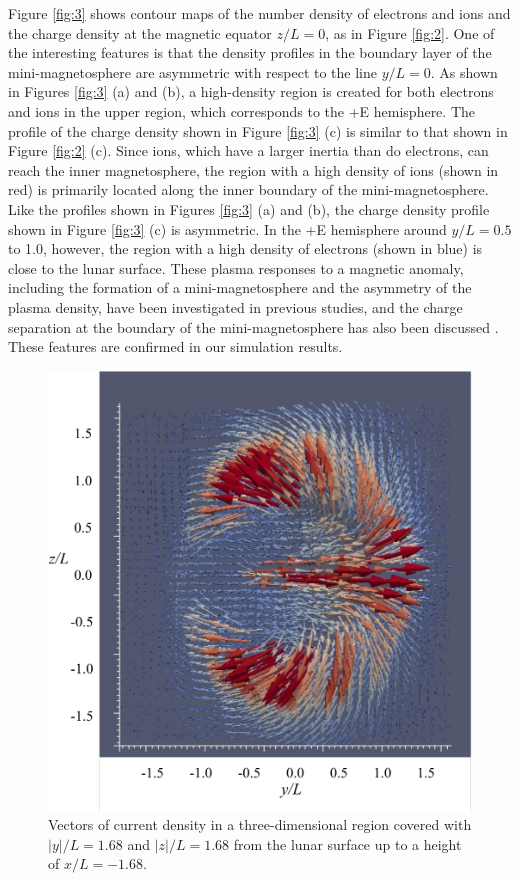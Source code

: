 \documentclass[draft,jgrga]{agutex2015}
\begin{document}
\begin{article}
Figure \ref{fig:3} shows contour maps of the number density of 
electrons and ions and the charge density 
at the magnetic equator $z/L=0$, as in 
Figure \ref{fig:2}. 
One of the interesting features is that the density profiles 
in the boundary layer of the mini-magnetosphere
are asymmetric with respect to the line $y/L =0$.
As shown in Figures \ref{fig:3} (a) and (b), a high-density region is created 
for both electrons and ions in the upper region,
which corresponds to the +E hemisphere. 
The profile of the charge density shown in Figure \ref{fig:3} (c) is 
similar to that shown in Figure \ref{fig:2} (c). 
Since ions, which have a larger inertia than do electrons, can reach the inner magnetosphere, the region with a 
high density of ions (shown in red) is primarily located
along the inner boundary of the mini-magnetosphere. 
Like the profiles shown in Figures \ref{fig:3} (a) and (b), 
the charge density profile shown in Figure \ref{fig:3} (c) is asymmetric. 
In the +E hemisphere around $y/L = 0.5$ to 1.0, however, the region with a
high density of electrons (shown in blue) is close to the lunar surface. 
These plasma responses to a magnetic anomaly, 
including the formation of a mini-magnetosphere and 
the asymmetry of the plasma density, have been investigated 
in previous studies, and the charge separation at the boundary of the mini-magnetosphere has also been discussed
 \citep[e.g.,][]{Harnett2002,Kallio2012,Poppe2012a,Deca2014,Deca2015}.
These features are confirmed in our simulation results.


\begin{figure}[h]
\centering
\noindent\includegraphics[width=12cm]{./figures/Fig_4_bb-crop.pdf}
\caption{
Vectors of current density in a three-dimensional region 
covered with $|y|/L=1.68$ and $|z|/L=1.68$ 
from the lunar surface up to a height of $x/L = -1.68$.
}
\label{fig:4}
\end{figure}


\end{article}
\end{document}
